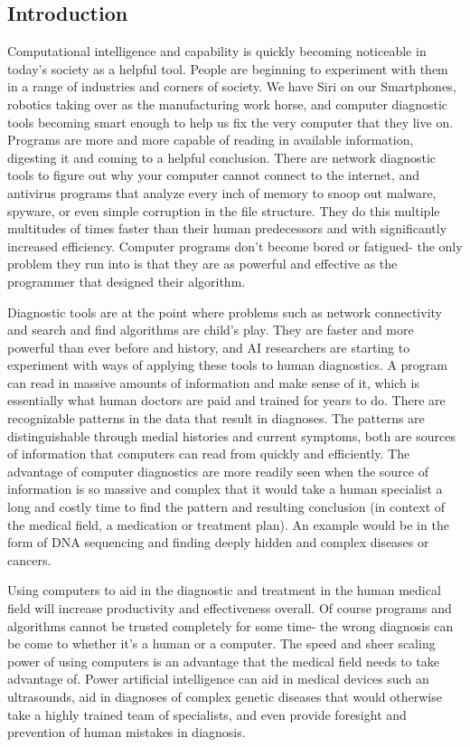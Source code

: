 \documentclass[11pt]{article}
\newcommand{\tab}{\hspace*{2em}}
\begin{document}
\begin{doublespace}
\section{Introduction}

    \tab Computational intelligence and capability is quickly becoming noticeable in today's society as a helpful tool. People are 
beginning to experiment with them in a range of industries and corners of society. We have Siri on our Smartphones, robotics 
taking over as the manufacturing work horse, and computer diagnostic tools becoming smart enough to help us fix the 
very computer that they live on. Programs are more and more capable of reading in available information, digesting it 
and coming to a helpful conclusion. There are network diagnostic tools to figure out why your computer cannot connect
to the internet, and antivirus programs that analyze every inch of memory to snoop out malware, spyware, or even simple
corruption in the file structure. They do this multiple multitudes of times faster than their human predecessors and with
significantly increased efficiency. Computer programs don't become bored or fatigued- the only problem they run into is that 
they are as powerful and effective as the programmer that designed their algorithm. 

    \tab Diagnostic tools are at the point where problems such as network connectivity and search and find algorithms are 
child's play. They are faster and more powerful than ever before and history, and AI researchers are starting to experiment 
with ways of applying these tools to human diagnostics. A program can read in massive amounts of information and 
make sense of it, which is essentially what human doctors are paid and trained for years to do. There are 
recognizable patterns in the data that result in diagnoses. The patterns are distinguishable through medial histories 
and current symptoms, both are sources of information that computers can read from quickly and efficiently. The advantage 
of computer diagnostics are more readily seen when the source of information is so massive and complex that it would take 
a human specialist a long and costly time to find the pattern and resulting conclusion (in context of the medical field, 
a medication or treatment plan). An example would be in the form of  DNA sequencing and finding deeply hidden and 
complex diseases or cancers. 

    \tab Using computers to aid in the diagnostic and treatment in the human medical field will increase productivity and 
effectiveness overall. Of course programs and algorithms cannot be trusted completely for some time- the wrong diagnosis can
 be come to whether it's a human or a computer. The speed and sheer scaling power of using computers is an advantage that
 the medical field needs to take advantage of. Power artificial intelligence can aid in medical devices such an ultrasounds,
 aid in diagnoses of complex genetic diseases that would otherwise take a highly trained team of specialists, and even provide
 foresight and prevention of human mistakes in diagnosis.  


\end{doublespace}
\end{document}
